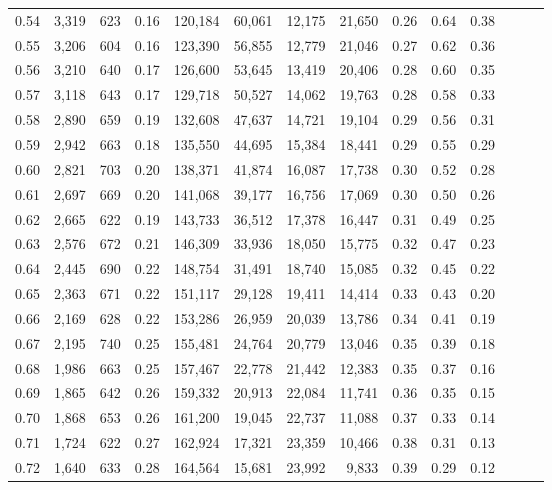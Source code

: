 \begin{tabular}{rrrrrrrrrrrrrr}
0.54 &  3,319 &  623 &  0.16 &  120,184 &   60,061 &  12,175 &  21,650 &  0.26 &  0.64 &      0.38 \\
0.55 &  3,206 &  604 &  0.16 &  123,390 &   56,855 &  12,779 &  21,046 &  0.27 &  0.62 &      0.36 \\
0.56 &  3,210 &  640 &  0.17 &  126,600 &   53,645 &  13,419 &  20,406 &  0.28 &  0.60 &      0.35 \\
0.57 &  3,118 &  643 &  0.17 &  129,718 &   50,527 &  14,062 &  19,763 &  0.28 &  0.58 &      0.33 \\
0.58 &  2,890 &  659 &  0.19 &  132,608 &   47,637 &  14,721 &  19,104 &  0.29 &  0.56 &      0.31 \\
0.59 &  2,942 &  663 &  0.18 &  135,550 &   44,695 &  15,384 &  18,441 &  0.29 &  0.55 &      0.29 \\
0.60 &  2,821 &  703 &  0.20 &  138,371 &   41,874 &  16,087 &  17,738 &  0.30 &  0.52 &      0.28 \\
0.61 &  2,697 &  669 &  0.20 &  141,068 &   39,177 &  16,756 &  17,069 &  0.30 &  0.50 &      0.26 \\
0.62 &  2,665 &  622 &  0.19 &  143,733 &   36,512 &  17,378 &  16,447 &  0.31 &  0.49 &      0.25 \\
0.63 &  2,576 &  672 &  0.21 &  146,309 &   33,936 &  18,050 &  15,775 &  0.32 &  0.47 &      0.23 \\
0.64 &  2,445 &  690 &  0.22 &  148,754 &   31,491 &  18,740 &  15,085 &  0.32 &  0.45 &      0.22 \\
0.65 &  2,363 &  671 &  0.22 &  151,117 &   29,128 &  19,411 &  14,414 &  0.33 &  0.43 &      0.20 \\
0.66 &  2,169 &  628 &  0.22 &  153,286 &   26,959 &  20,039 &  13,786 &  0.34 &  0.41 &      0.19 \\
0.67 &  2,195 &  740 &  0.25 &  155,481 &   24,764 &  20,779 &  13,046 &  0.35 &  0.39 &      0.18 \\
0.68 &  1,986 &  663 &  0.25 &  157,467 &   22,778 &  21,442 &  12,383 &  0.35 &  0.37 &      0.16 \\
0.69 &  1,865 &  642 &  0.26 &  159,332 &   20,913 &  22,084 &  11,741 &  0.36 &  0.35 &      0.15 \\
0.70 &  1,868 &  653 &  0.26 &  161,200 &   19,045 &  22,737 &  11,088 &  0.37 &  0.33 &      0.14 \\
0.71 &  1,724 &  622 &  0.27 &  162,924 &   17,321 &  23,359 &  10,466 &  0.38 &  0.31 &      0.13 \\
0.72 &  1,640 &  633 &  0.28 &  164,564 &   15,681 &  23,992 &   9,833 &  0.39 &  0.29 &      0.12 \\

\end{tabular}
